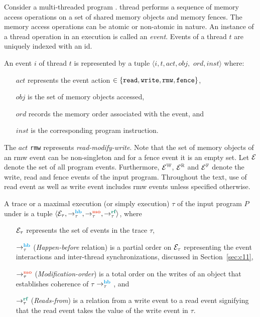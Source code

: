 Consider a multi-threaded \cc
program . 
  thread 
performs a sequence of memory access operations on a set of shared
memory objects and \cc memory fences.  The memory access operations
can be atomic or non-atomic in nature.
%
An instance of a thread operation in an execution is called an {\em
event}.  Events of a thread $t$ are uniquely indexed with an id.
%
\begin{definition}[Event]\newline
An event $i$ of thread $t$ is represented by a tuple $\langle i, t, act, obj,$ $ ord, inst \rangle$ where:
\begin{itemize}[label=inst,align=left,leftmargin=*]
\item [$act$] represents the event action $\in \{ \text{\tt read}, \text{\tt write}, \text{\tt rmw}, \text{\tt fence} \} $,
\item [$obj$] is the set of memory objects accessed,
\item [$ord$] records the \cc memory order associated with the event, and
\item [$inst$] is the corresponding program instruction.
\end{itemize}
\end{definition}
The $act$ {\tt rmw} represents {\em read-modify-write}.
%
Note that the set of memory objects of an rmw event can be non-singleton 
and for a fence event it is an empty set.
%
Let $\mathcal{E}$ denote the set of all program events. Furthermore,
$\mathcal{E}^{\mathbb{W}}$, $\mathcal{E}^{\mathbb{R}}$ and $\mathcal{E}^{\mathbb{F}}$ denote the write, read and fence 
events of the input program.
%
Throughout the text, use of read event as well as write event includes rmw
events unless specified otherwise.
%
\begin{definition}[Trace]\newline
	A trace or a maximal execution (or simply execution) $\tau$ of the input 
	program $P$ under \cc is a tuple 
	$\langle \events_\tau, \setHB, \setMO, \setRF \rangle$, where
	\begin{itemize}[label=sethb,align=left,leftmargin=*]
		\item [$\mathcal{E}_\tau$] represents the set of events in the trace $\tau$,
		\item [$\setHB$] ({\em Happen-before} relation) is a partial order on
			$\mathcal{E}_\tau$ representing the event interactions and inter-thread
			synchronizations, discussed in Section~\ref{sec:c11},
		\item [$\setMO$] ({\em Modification-order}) is a total order on the
			writes of an object that establishes coherence of $\tau$ 
			\wrt $\setHB$ , and
		\item [$\setRF$] ({\em Reads-from}) is a relation from a write event to
			a read event signifying that the read event takes the value of 
			the write event in $\tau$.
	\end{itemize}
\end{definition}

